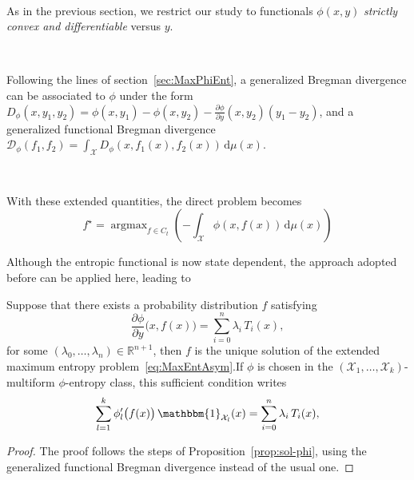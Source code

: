 \documentclass[entropy,article,submit,moreauthors,pdftex]{Definitions/mdpi}
\def\dmu{\mathrm{d}\mu}%
\def\fD{\mathcal{D}}%
\def\Rset{\mathbb{R}}%
\def\X{\mathcal{X}}%
\def\un{\mathbbm{1}}%
\DeclareMathOperator*{\argmax}{\operatorname{argmax}}%
\begin{document}
\

As in  the previous section,  we restrict  our study to  functionals $\phi(x,y)$
{\em strictly convex and differentiable} versus $y$.

\

Following  the  lines  of  section~\ref{sec:MaxPhiEnt},  a  generalized  Bregman
divergence  can be  associated to  $\phi$  under the  form $D_\phi(x,y_1,y_2)  =
\phi(x,y_1) - \phi(x,y_2) - \frac{\partial \phi}{\partial y}(x,y_2) \left( y_1 -
y_2  \right)$, and  a generalized  functional Bregman  divergence $\displaystyle
\fD_\phi(f_1,f_2) = \int_\X D_\phi(x,f_1(x),f_2(x)) \, \dmu(x)$.

\

With these extended quantities, the direct problem becomes
%
\begin{equation}\label{eq:MaxEntAsym}
f^\star = \argmax_{f \in C_t} \left( - \int_\X \phi(x,f(x)) \, \dmu(x) \right)
\end{equation}

Although the  entropic functional is  now state dependent, the  approach adopted
before can be applied here, leading to

\begin{Proposition}
\label{prop:sol-asym_phi}
%
  Suppose that there exists a probability distribution $f$ satisfying
  \begin{equation}\label{eq:sol-asym_phi}
  \frac{\partial \phi}{\partial y}\big(x,f(x)\big) = \sum_{i=0}^n \lambda_i \,
  T_i(x),
  \end{equation}
  for  some  $(\lambda_0,\ldots,\lambda_n) \in  \Rset^{n+1}$,  then  $f$ is  the
  unique      solution      of       the      extended      maximum      entropy
  problem~\eqref{eq:MaxEntAsym}.\newline  If $\phi$  is chosen  in the  $(\X_1 ,
  \ldots  , \X_k)$-multiform  $\phi$-entropy  class,  this sufficient  condition
  writes
  \begin{equation}\label{eq:sol-multiform_phi}
  \sum_{l=1}^k \phi_l'\big(f(x)\big) \, \un_{\X_l}(x) = \sum_{i=0}^n \lambda_i
  \, T_i(x),
  \end{equation}
\end{Proposition}
%
\begin{proof}
  The  proof  follows the  steps  of  Proposition~\ref{prop:sol-phi}, using  the
  generalized functional Bregman divergence instead of the usual one.
\end{proof}
\end{document}
